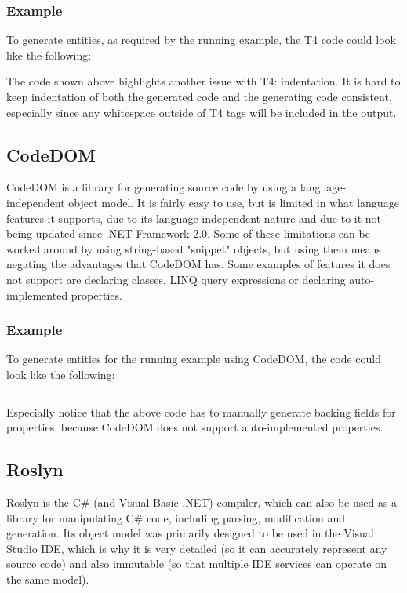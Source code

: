 \subsubsection{Example}

To generate entities, as required by the running example, the \ac{T4} code could look like the following:


The code shown above highlights another issue with \ac{T4}: indentation. It is hard to keep indentation of both the generated code and the generating code consistent, especially since any whitespace outside of \ac{T4} tags will be included in the output.

\subsection{CodeDOM}

\ac{CodeDOM} is a library for generating source code by using a language-independent object model. It is fairly easy to use, but is limited in what language features it supports, due to its language-independent nature and due to it not being updated since .NET Framework 2.0. Some of these limitations can be worked around by using string-based "snippet" objects, but using them means negating the advantages that CodeDOM has. Some examples of features it does not support are declaring  classes, LINQ query expressions or declaring auto-implemented properties.

\subsubsection{Example}

To generate entities for the running example using CodeDOM, the code could look like the following:

\inputminted[firstline=14,lastline=102]{csharp}{samples/CodeDOM/Program.cs}

Especially notice that the above code has to manually generate backing fields for properties, because CodeDOM does not support auto-implemented properties.

\subsection{Roslyn}

Roslyn \cite{roslyn} is the C\# (and Visual Basic .NET) compiler, which can also be used as a library for manipulating C\# code, including parsing, modification and generation. Its object model was primarily designed to be used in the Visual Studio \ac{IDE}, which is why it is very detailed (so it can accurately represent any source code) and also immutable (so that multiple \ac{IDE} services can operate on the same model).

